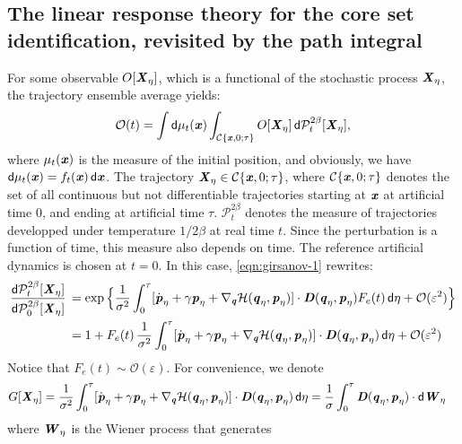 \documentclass[aip,jcp,a4paper,reprint,onecolumn]{revtex4-1}
\newcommand{\vect}[1]{\textbf{\textit{#1}}}
\newcommand{\dd}{\textsf{d}}
\newcommand{\mh}{\mathcal H}
\newcommand{\mo}{\mathcal O}
\newcommand{\mc}{\mathcal C}
\begin{document}
\subsection{The linear response theory for the core set identification,
  revisited by the path integral}
For some observable $O[\vect X_\eta]$, which is a functional of the
stochastic process $\vect X_\eta$,
the trajectory ensemble average yields:
\begin{align}
  \mo(t)
  =
  \int \dd \mu_t(\vect x)
  \int_{\mc\{\vect x,0;\tau\}}
  O[\vect X_\eta]\,
  \dd \mathcal P^{2\beta}_t[\vect X_\eta],
\end{align}
where $\mu_t(\vect x)$
is the measure of the initial position, and obviously, we have
$\dd \mu_t(\vect x) = f_t(\vect x)\,\dd \vect x$.
The trajectory $\vect X_\eta \in {\mc\{\vect x,0;\tau\}}$, where
${\mc\{\vect x,0;\tau\}}$ denotes the set of all continuous but not
differentiable trajectories starting at $\vect x$ at artificial
time 0, and ending
at artificial time $\tau$.
$\mathcal P^{2\beta}_t$ denotes the measure of trajectories
developped under temperature $1/2\beta$
at real time $t$.
Since the perturbation is a function of time, this
measure also depends on time. The reference artificial dynamics is chosen
at $t=0$.
In this case, \eqref{eqn:girsanov-1} rewrites:
\begin{align}\nonumber
  \frac{\dd \mathcal P^{2\beta}_t[\vect X_\eta]}
  {\dd \mathcal P^{2\beta}_0[\vect X_\eta]}\,
  &=
  \exp
  \Big\{
  \frac 1 {\sigma^2}
  \int_0^\tau
  [\dot{\vect p}_\eta +
  \gamma\vect p_\eta +
  \nabla_{\vect q}\mh(\vect q_\eta,\vect p_\eta)
  ]\cdot
  \vect D(\vect q_\eta,\vect p_\eta)
  F_e(t)\,
  \dd \eta
  + \mathcal O(\varepsilon^2)
  \Big\}\\
  &=
  1+
  F_e(t)\,
  \frac 1 {\sigma^2}
  \int_0^\tau
  [\dot{\vect p}_\eta +
  \gamma\vect p_\eta +
  \nabla_{\vect q}\mh(\vect q_\eta,\vect p_\eta)
  ]\cdot
  \vect D(\vect q_\eta,\vect p_\eta)\,
  \dd \eta
  + \mathcal O(\varepsilon^2)  
\end{align}
Notice that $F_e(t)\sim \mo(\varepsilon)$.
For convenience, we denote
\begin{align}
  G[\vect X_\eta] &=
    \frac 1 {\sigma^2}
  \int_0^\tau
  [\dot{\vect p}_\eta +
  \gamma\vect p_\eta +
  \nabla_{\vect q}\mh(\vect q_\eta,\vect p_\eta)
  ]\cdot
  \vect D(\vect q_\eta,\vect p_\eta)\,
  \dd \eta =
  \frac1\sigma\int_0^\tau
  \vect D(\vect q_\eta,\vect p_\eta)
  \cdot\dd \vect W_\eta
\end{align}
where $\vect W_\eta$ is the Wiener process that generates
\end{document}
